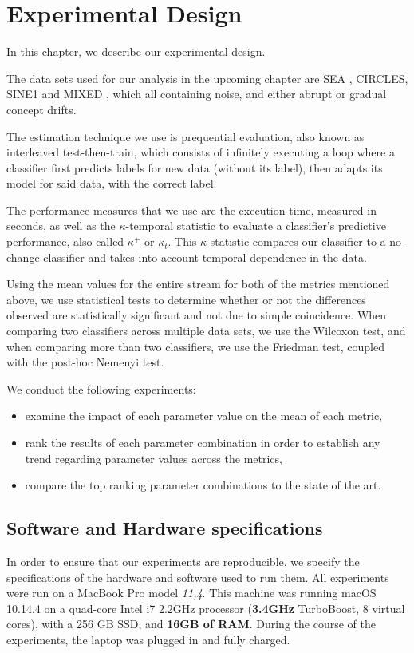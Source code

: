 

\chapter{Experimental Design\label{chapter:experimental_design}} %
In this chapter, we describe our experimental design.

The data sets used for our analysis in the upcoming chapter are SEA \cite{street2001streaming}, CIRCLES, SINE1 and MIXED \cite{10.1007/3-540-59286-5_74}, which all containing noise, and either abrupt or gradual concept drifts.

The estimation technique we use is prequential evaluation, also known as interleaved test-then-train, which consists of infinitely executing a loop where a classifier first predicts labels for new data (without its label), then adapts its model for said data, with the correct label.

The performance measures that we use are the execution time, measured in seconds, as well as the $\kappa$-temporal statistic to evaluate a classifier's predictive performance, also called $\kappa^+$ or $\kappa_t$. This $\kappa$ statistic compares our classifier to a no-change classifier and takes into account temporal dependence in the data.

Using the mean values for the entire stream for both of the metrics mentioned above, we use statistical tests to determine whether or not the differences observed are statistically significant and not due to simple coincidence. When comparing two classifiers across multiple data sets, we use the Wilcoxon test, and when comparing more than two classifiers, we use the Friedman test, coupled with the post-hoc Nemenyi test.

We conduct the following experiments:
\begin{itemize}
\item  examine the impact of each parameter value on the mean of each metric,
\item rank the results of each parameter combination in order to establish any trend regarding parameter values across the metrics,
\item compare the top ranking parameter combinations to the state of the art.
\end{itemize}


\section{Software and Hardware specifications}
In order to ensure that our experiments are reproducible, we specify the specifications of the hardware and software used to run them. All experiments were run on a MacBook Pro model \textit{11,4}. This machine was running macOS 10.14.4 on a quad-core Intel i7 2.2GHz processor (\textbf{3.4GHz} TurboBoost, 8 virtual cores), with a 256 GB SSD, and \textbf{16GB of RAM}. During the course of the experiments, the laptop was plugged in and fully charged.

